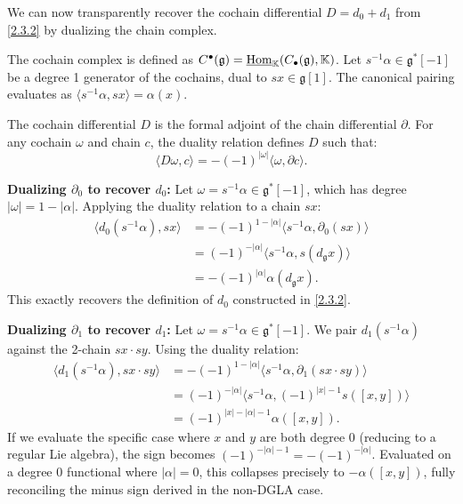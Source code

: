 











\begin{discussion}\label{2.4.3}
    We can now transparently recover the cochain differential $D = d_0 + d_1$ from \cref{2.3.2} by dualizing the chain complex.
    
    The cochain complex is defined as $C^\bullet(\mathfrak{g}) = \underline{\operatorname{Hom}}_\mathbb{K}(C_\bullet(\mathfrak{g}), \mathbb{K})$. 
    Let $s^{-1}\alpha \in \mathfrak{g}^*[-1]$ be a degree 1 generator of the cochains, dual to $sx \in \mathfrak{g}[1]$. The canonical pairing evaluates as $\langle s^{-1}\alpha, sx \rangle = \alpha(x)$.

    The cochain differential $D$ is the formal adjoint of the chain differential $\partial$. For any cochain $\omega$ and chain $c$, the duality relation defines $D$ such that:
    \[
        \langle D\omega, c \rangle = -(-1)^{|\omega|} \langle \omega, \partial c \rangle.
    \]

    \textbf{Dualizing $\partial_0$ to recover $d_0$:}
    Let $\omega = s^{-1}\alpha \in \mathfrak{g}^*[-1]$, which has degree $|\omega| = 1 - |\alpha|$. Applying the duality relation to a chain $sx$:
    \begin{align*}
        \langle d_0(s^{-1}\alpha), sx \rangle &= -(-1)^{1-|\alpha|} \langle s^{-1}\alpha, \partial_0(sx) \rangle \\
        &= (-1)^{-|\alpha|} \langle s^{-1}\alpha, s(d_\mathfrak{g}x) \rangle \\
        &= -(-1)^{|\alpha|} \alpha(d_\mathfrak{g}x).
    \end{align*}
    This exactly recovers the definition of $d_0$ constructed in \cref{2.3.2}.

    \textbf{Dualizing $\partial_1$ to recover $d_1$:}
    Let $\omega = s^{-1}\alpha \in \mathfrak{g}^*[-1]$. We pair $d_1(s^{-1}\alpha)$ against the 2-chain $sx \cdot sy$. Using the duality relation:
    \begin{align*}
        \langle d_1(s^{-1}\alpha), sx \cdot sy \rangle &= -(-1)^{1-|\alpha|} \langle s^{-1}\alpha, \partial_1(sx \cdot sy) \rangle \\
        &= (-1)^{-|\alpha|} \langle s^{-1}\alpha, (-1)^{|x|-1} s([x,y]) \rangle \\
        &= (-1)^{|x|-|\alpha|-1} \alpha([x,y]).
    \end{align*}
    If we evaluate the specific case where $x$ and $y$ are both degree 0 (reducing to a regular Lie algebra), the sign becomes $(-1)^{-|\alpha|-1} = -(-1)^{-|\alpha|}$. Evaluated on a degree 0 functional where $|\alpha|=0$, this collapses precisely to $-\alpha([x,y])$, fully reconciling the minus sign derived in the non-DGLA case.
\end{discussion}







